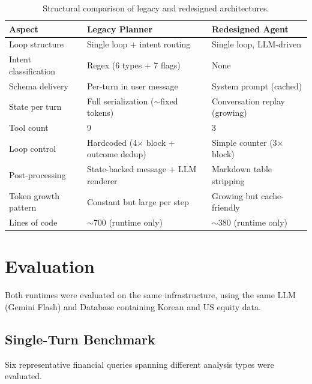 \documentclass{article}
\begin{document}
\begin{table}[t]
\centering
\caption{Structural comparison of legacy and redesigned architectures.}
\label{tab:arch}
\small
\begin{tabular}{@{}lll@{}}
\toprule
\textbf{Aspect} & \textbf{Legacy Planner} & \textbf{Redesigned Agent} \\
\midrule
Loop structure & Single loop + intent routing & Single loop, LLM-driven \\
Intent classification & Regex (6 types + 7 flags) & None \\
Schema delivery & Per-turn in user message & System prompt (cached) \\
State per turn & Full serialization (${\sim}$fixed tokens) & Conversation replay (growing) \\
Tool count & 9 & 3 \\
Loop control & Hardcoded (4$\times$ block + outcome dedup) & Simple counter (3$\times$ block) \\
Post-processing & State-backed message + LLM renderer & Markdown table stripping \\
Token growth pattern & Constant but large per step & Growing but cache-friendly \\
Lines of code & ${\sim}$700 (runtime only) & ${\sim}$380 (runtime only) \\
\bottomrule
\end{tabular}
\end{table}

\section{Evaluation}

Both runtimes were evaluated on the same infrastructure, using the same LLM (Gemini Flash) and Database containing Korean and US equity data.

\subsection{Single-Turn Benchmark}

Six representative financial queries spanning different analysis types were evaluated.
\end{document}
